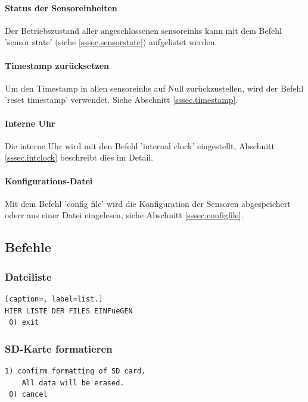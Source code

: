 \paragraph{Status der Sensoreinheiten} Der Betriebszustand aller angeschlossenen \glspl{sensoreinh} kann mit dem Befehl 'sensor state' (siehe \ref{sssec.sensorstate}) aufgelistet werden.

\paragraph{Timestamp zurücksetzen} Um den Timestamp in allen \glspl{sensoreinh} auf Null zurückzustellen, wird der Befehl 'reset timestamp' verwendet. Siehe Abschnitt \ref{sssec.timestamp}.

\paragraph{Interne Uhr} Die interne Uhr wird mit den Befehl 'internal clock' eingestellt, Abschnitt \ref{sssec.intclock} beschreibt dies im Detail.

\paragraph{Konfigurations-Datei} Mit dem Befehl 'config file' wird die Konfiguration der Sensoren abgespeichert oderr aus einer Datei eingelesen, siehe Abschnitt \ref{sssec.configfile}.

\subsection{Befehle}\label{ssec.befehle}

\subsubsection{Dateiliste}\label{ssec.listfiles}
\begin{lstlisting}[caption=, label=list.]
HIER LISTE DER FILES EINFueGEN
 0) exit
\end{lstlisting}


\subsubsection{SD-Karte formatieren}\label{sssec.sdformat}
\begin{lstlisting}[caption=Untermenü SD-Karte formatieren, label=list.sdformat]
 1) confirm formatting of SD card.
    All data will be erased.
 0) cancel
\end{lstlisting}

